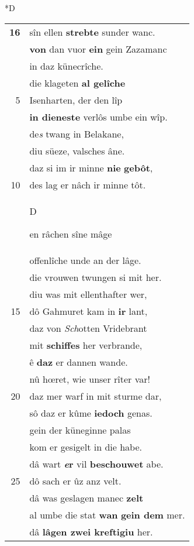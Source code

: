 \documentclass[8pt,a4paper,notitlepage]{article}
\begin{document}
\begin{table}[ht]
\begin{minipage}[t]{0.5\linewidth}
\small
\begin{center}*D
\end{center}
\begin{tabular}{rl}
\textbf{16} & sîn ellen \textbf{strebte} sunder wanc.\\ 
 & \textbf{von} dan vuor \textbf{ein} gein Zazamanc\\ 
 & in daz künecrîche.\\ 
 & die klageten \textbf{al gelîche}\\ 
5 & Isenharten, der den lîp\\ 
 & \textbf{in dieneste} verlôs umbe ein wîp.\\ 
 & de\textit{s} twang in Belakane,\\ 
 & diu süeze, valsches âne.\\ 
 & daz si im ir minne \textbf{nie} \textbf{gebôt},\\ 
10 & des lag er nâch ir minne tôt.\\ 
 & \begin{large}D\end{large}en râchen sîne mâge\\ 
 & offenlîche unde an der lâge.\\ 
 & die vrouwen twungen si mit her.\\ 
 & diu was mit ellenthafter wer,\\ 
15 & dô Gahmuret kam in \textbf{ir} lant,\\ 
 & daz von \textit{Sch}otten Vridebrant\\ 
 & mit \textbf{schiffes} her verbrande,\\ 
 & ê \textbf{daz} er dannen wande.\\ 
 & nû hœret, wie unser rîter var!\\ 
20 & daz mer warf in mit sturme dar,\\ 
 & sô daz er kûme \textbf{iedoch} genas.\\ 
 & gein der küneginne palas\\ 
 & kom er gesigelt in die habe.\\ 
 & dâ wart \textbf{\textit{e}r} vil \textbf{beschouwet} abe.\\ 
25 & dô sach er ûz anz velt.\\ 
 & dâ was geslagen manec \textbf{zelt}\\ 
 & al umbe die stat \textbf{wan} \textbf{gein dem} mer.\\ 
 & dâ \textbf{lâgen zwei kreftigiu} her.\\ 

\end{tabular}
\end{minipage}
\end{table}
\end{document}
